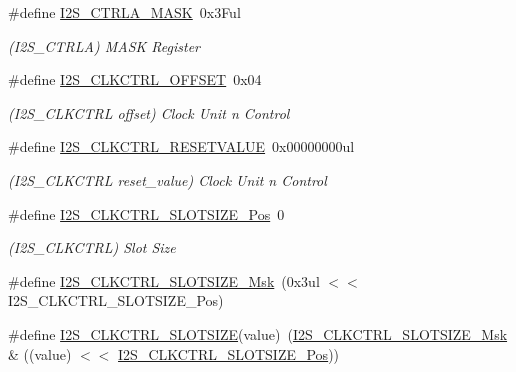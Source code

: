 \begin{DoxyCompactItemize}
\item 
\#define \mbox{\hyperlink{group___s_a_m_d21___i2_s_ga89739cb190180a69697f3ece0470b780}{I2\+S\+\_\+\+C\+T\+R\+L\+A\+\_\+\+M\+A\+SK}}~0x3\+Ful
\begin{DoxyCompactList}\small\item\em (I2\+S\+\_\+\+C\+T\+R\+LA) M\+A\+SK Register \end{DoxyCompactList}\item 
\#define \mbox{\hyperlink{group___s_a_m_d21___i2_s_gac9120317bb8722d15b6abd2964cc6b66}{I2\+S\+\_\+\+C\+L\+K\+C\+T\+R\+L\+\_\+\+O\+F\+F\+S\+ET}}~0x04
\begin{DoxyCompactList}\small\item\em (I2\+S\+\_\+\+C\+L\+K\+C\+T\+RL offset) Clock Unit n Control \end{DoxyCompactList}\item 
\#define \mbox{\hyperlink{group___s_a_m_d21___i2_s_ga34cc8d707a5387d2ff9232ba0b30f95e}{I2\+S\+\_\+\+C\+L\+K\+C\+T\+R\+L\+\_\+\+R\+E\+S\+E\+T\+V\+A\+L\+UE}}~0x00000000ul
\begin{DoxyCompactList}\small\item\em (I2\+S\+\_\+\+C\+L\+K\+C\+T\+RL reset\+\_\+value) Clock Unit n Control \end{DoxyCompactList}\item 
\#define \mbox{\hyperlink{group___s_a_m_d21___i2_s_ga3790543c148a2adda023e411fd6595ad}{I2\+S\+\_\+\+C\+L\+K\+C\+T\+R\+L\+\_\+\+S\+L\+O\+T\+S\+I\+Z\+E\+\_\+\+Pos}}~0
\begin{DoxyCompactList}\small\item\em (I2\+S\+\_\+\+C\+L\+K\+C\+T\+RL) Slot Size \end{DoxyCompactList}\item 
\#define \mbox{\hyperlink{group___s_a_m_d21___i2_s_ga44dd337625fc79571870ef2128a2511d}{I2\+S\+\_\+\+C\+L\+K\+C\+T\+R\+L\+\_\+\+S\+L\+O\+T\+S\+I\+Z\+E\+\_\+\+Msk}}~(0x3ul $<$$<$ I2\+S\+\_\+\+C\+L\+K\+C\+T\+R\+L\+\_\+\+S\+L\+O\+T\+S\+I\+Z\+E\+\_\+\+Pos)
\item 
\#define \mbox{\hyperlink{group___s_a_m_d21___i2_s_gafd401f673040058bc2f610bbd8b8d045}{I2\+S\+\_\+\+C\+L\+K\+C\+T\+R\+L\+\_\+\+S\+L\+O\+T\+S\+I\+ZE}}(value)~(\mbox{\hyperlink{group___s_a_m_d21___i2_s_ga44dd337625fc79571870ef2128a2511d}{I2\+S\+\_\+\+C\+L\+K\+C\+T\+R\+L\+\_\+\+S\+L\+O\+T\+S\+I\+Z\+E\+\_\+\+Msk}} \& ((value) $<$$<$ \mbox{\hyperlink{group___s_a_m_d21___i2_s_ga3790543c148a2adda023e411fd6595ad}{I2\+S\+\_\+\+C\+L\+K\+C\+T\+R\+L\+\_\+\+S\+L\+O\+T\+S\+I\+Z\+E\+\_\+\+Pos}}))
\item 

\end{DoxyCompactItemize}
